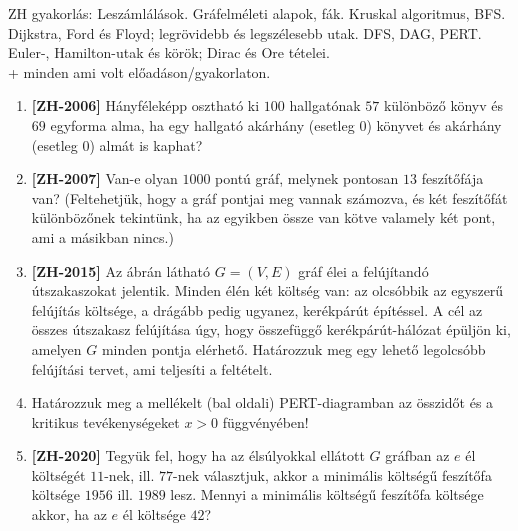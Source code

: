 \documentclass[a4paper, 12pt]{article}
\begin{document}
    \noindent{}
    \noindent{}

    \noindent\centering\parbox[c][5em][c]{0.8\textwidth}{\centering ZH gyakorlás: Leszámlálások. Gráfelméleti alapok, fák. Kruskal algoritmus, BFS. Dijkstra, Ford és Floyd; legrövidebb és legszélesebb utak. DFS, DAG, PERT. Euler-, Hamilton-utak és körök; Dirac és Ore tételei. \\ + minden ami volt előadáson/gyakorlaton.}

    \begin{enumerate}
        \item \textbf{[ZH-2006]} Hányféleképp osztható ki $100$ hallgatónak $57$ különböző könyv és $69$ egyforma alma, ha egy hallgató akárhány (esetleg $0$) könyvet és akárhány (esetleg 0) almát is kaphat?
        \item \textbf{[ZH-2007]} Van-e olyan $1000$ pontú gráf, melynek pontosan $13$ feszítőfája van? (Feltehetjük, hogy a gráf pontjai meg vannak számozva, és két feszítőfát különbözőnek tekintünk, ha az egyikben össze van kötve valamely két pont, ami a másikban nincs.)
        \item \textbf{[ZH-2015]} Az ábrán látható $G=(V,E)$ gráf élei a felújítandó útszakaszokat jelentik. Minden élén két költség van: az olcsóbbik az egyszerű felújítás költsége, a drágább pedig ugyanez, kerékpárút építéssel. A cél az összes útszakasz felújítása úgy, hogy összefüggő kerékpárút-hálózat épüljön ki, amelyen $G$ minden pontja elérhető. Határozzuk meg egy lehető legolcsóbb felújítási tervet, ami teljesíti a feltételt.
        \begin{figure}[!ht]
            \centering
            
        \end{figure}
        \item Határozzuk meg a mellékelt (bal oldali) PERT-diagramban az összidőt és a kritikus tevékenységeket $x>0$ függvényében! 
        \begin{figure}[!ht]
            \centering
             \hspace{1in}
            
        \end{figure}
        \item \textbf{[ZH-2020]} Tegyük fel, hogy ha az élsúlyokkal ellátott $G$ gráfban az $e$ él költségét $11$-nek, ill. $77$-nek választjuk, akkor a minimális költségű feszítőfa költsége $1956$ ill. $1989$ lesz. Mennyi a minimális költségű feszítőfa költsége akkor, ha az $e$ él költsége $42$?

\end{enumerate}
\end{document}
